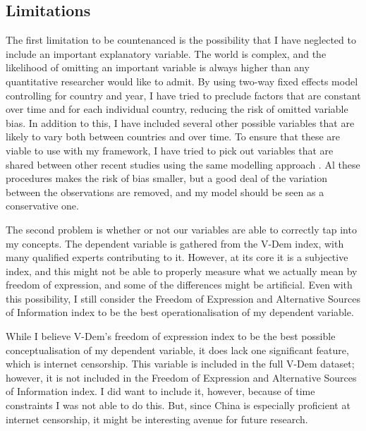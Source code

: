 \subsection{Limitations}
The first limitation to be countenanced is the possibility that I have neglected to include an important explanatory variable. The world is complex, and the likelihood of omitting an important variable is always higher than any quantitative researcher would like to admit. By using two-way fixed effects model controlling for country and year, I have tried to preclude factors that are constant over time and for each individual country, reducing the risk of omitted variable bias. In addition to this, I have included several other possible variables that are likely to vary both between countries and over time. To ensure that these are viable to use with my framework, I have tried to pick out variables that are shared between other recent studies using the same modelling approach \citep{gamso_is_2021, toettoe_foreign_2023}. Al these procedures makes the risk of bias smaller, but a good deal of the variation between the observations are removed, and my model should be seen as a conservative one. 

The second problem is whether or not our variables are able to correctly tap into my concepts. The dependent variable is gathered from the V-Dem index, with many qualified experts contributing to it. However, at its core it is a subjective index, and this might not be able to properly measure what we actually mean by freedom of expression, and some of the differences might be artificial. Even with this possibility, I still consider the Freedom of Expression and Alternative Sources of Information index to be the best operationalisation of my dependent variable.

While I believe V-Dem's freedom of expression index to be the best possible conceptualisation of my dependent variable, it does lack one significant feature, which is internet censorship. This variable is included in the full V-Dem dataset; however, it is not included in the Freedom of Expression and Alternative Sources of Information index. I did want to include it, however, because of time constraints I was not able to do this. But, since China is especially proficient at internet censorship, it might be interesting avenue for future research.

